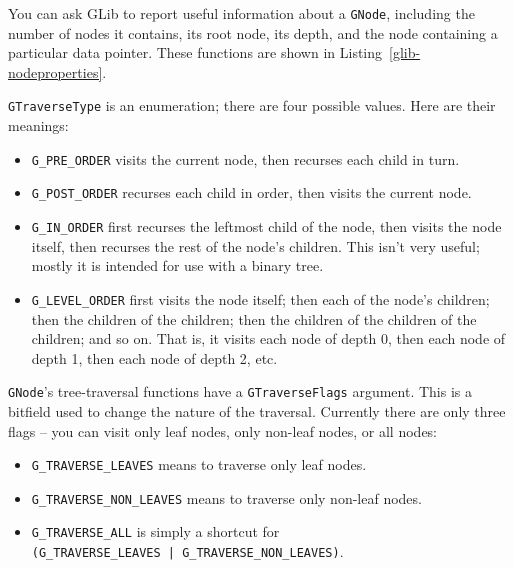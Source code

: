 You can ask GLib to report useful information about a \lstinline{GNode}, including the number of nodes it contains, its root node, its depth, and the node containing a particular data pointer. These functions are shown in Listing~\ref{glib-nodeproperties}.

\lstinline{GTraverseType} is an enumeration; there are four possible values. Here are their meanings:
\begin{itemize}
  \item \lstinline{G_PRE_ORDER} visits the current node, then recurses each child in turn.

  \item \lstinline{G_POST_ORDER} recurses each child in order, then visits the current node.

  \item \lstinline{G_IN_ORDER} first recurses the leftmost child of the node, then visits the node itself, then recurses the rest of the node's children. This isn't very useful; mostly it is intended for use with a binary tree.

  \item \lstinline{G_LEVEL_ORDER} first visits the node itself; then each of the node's children; then the children of the children; then the children of the children of the children; and so on. That is, it visits each node of depth 0, then each node of depth 1, then each node of depth 2, etc.
\end{itemize}

\lstinline{GNode}'s tree-traversal functions have a \lstinline{GTraverseFlags} argument. This is a bitfield used to change the nature of the traversal. Currently there are only three flags -- you can visit only leaf nodes, only non-leaf nodes, or all nodes:
\begin{itemize}
  \item \lstinline{G_TRAVERSE_LEAVES} means to traverse only leaf nodes.
  \item \lstinline{G_TRAVERSE_NON_LEAVES} means to traverse only non-leaf nodes.
  \item \lstinline{G_TRAVERSE_ALL} is simply a shortcut for\\
    \lstinline{(G_TRAVERSE_LEAVES | G_TRAVERSE_NON_LEAVES)}.
\end{itemize}


